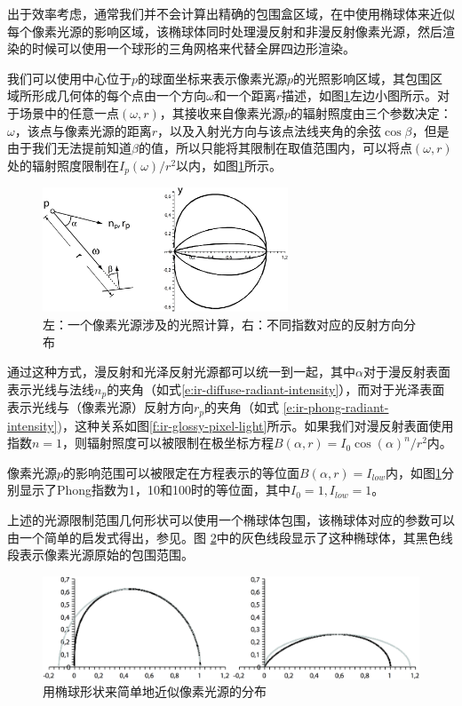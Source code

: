 出于效率考虑，通常我们并不会计算出精确的包围盒区域，在\cite{a:SplattingIndirectIllumination}中使用椭球体来近似每个像素光源的影响区域，该椭球体同时处理漫反射和非漫反射像素光源，然后渲染的时候可以使用一个球形的三角网格来代替全屏四边形渲染。

我们可以使用中心位于$p$的球面坐标来表示像素光源$p$的光照影响区域，其包围区域所形成几何体的每个点由一个方向$\omega$和一个距离$r$描述，如图\ref{f:ir-pixel-light-region}左边小图所示。对于场景中的任意一点$(\omega,r)$，其接收来自像素光源$p$的辐射照度由三个参数决定：$\omega$，该点与像素光源的距离$r$，以及入射光方向与该点法线夹角的余弦$\cos\beta$，但是由于我们无法提前知道$\beta$的值，所以只能将其限制在取值范围内，可以将点$(\omega,r)$处的辐射照度限制在$I_p(\omega)/r^{2}$以内，如图\ref{f:ir-pixel-light-region}所示。

\begin{figure}
	\sidecaption
	\includegraphics[width=0.65\textwidth]{figures/ir/ir-3-6}
	\caption{左：一个像素光源涉及的光照计算，右：不同指数对应的反射方向分布}
	\label{f:ir-pixel-light-region}
\end{figure}

通过这种方式，漫反射和光泽反射光源都可以统一到一起，其中$\alpha$对于漫反射表面表示光线与法线$n_p$的夹角（如式\ref{e:ir-diffuse-radiant-intensity}），而对于光泽表面表示光线与（像素光源）反射方向$r_p$的夹角（如式 \ref{e:ir-phong-radiant-intensity})，这种关系如图\ref{f:ir-glossy-pixel-light}所示。如果我们对漫反射表面使用指数$n = 1$，则辐射照度可以被限制在极坐标方程$B(\alpha,r) = I_0 \cos(\alpha)^{n}/r^{2}$内。

像素光源$p$的影响范围可以被限定在方程表示的等位面$B(\alpha,r) = I_{low}$内，如图\ref{f:ir-pixel-light-region}分别显示了Phong指数为1，10和100时的等位面，其中$I_0 = 1, I_{low} = 1$。

上述的光源限制范围几何形状可以使用一个椭球体包围，该椭球体对应的参数可以由一个简单的启发式得出，参见\cite{a:SplattingIndirectIllumination}。图 \ref{f:ir-ellipses}中的灰色线段显示了这种椭球体，其黑色线段表示像素光源原始的包围范围。

\begin{figure}
	\begin{center}
		\includegraphics[width=\textwidth]{figures/ir/ir-3-7}
	\end{center}
	\caption{用椭球形状来简单地近似像素光源的分布}
	\label{f:ir-ellipses}
\end{figure}




